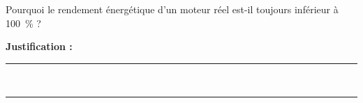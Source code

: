 Pourquoi le rendement énergétique d'un moteur réel est-il toujours inférieur à \qty{100}{\percent} ?

\choices

\noindent\textbf{Justification :} \hrulefill \\[2.5ex]
\rule{\linewidth}{0.4pt} \\[2.5ex]
\rule{\linewidth}{0.4pt}
\vfill

